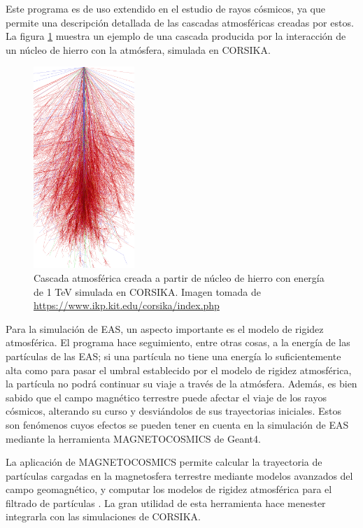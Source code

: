 \documentclass[12pt]{report}
\begin{document}
Este programa es de uso extendido en el estudio de rayos cósmicos, ya que permite una descripción detallada de las cascadas atmosféricas creadas por estos. La figura \ref{fig:ironcascade} muestra un ejemplo de una cascada producida por la interacción de un núcleo de hierro con la atmósfera, simulada en CORSIKA.

\begin{figure}
    \centering
    \includegraphics[width=1.5in]{images/ironcascade.png}
    \caption{Cascada atmosférica creada a partir de núcleo de hierro con energía de 1 TeV simulada en CORSIKA. Imagen tomada de \url{https://www.ikp.kit.edu/corsika/index.php}}
    \label{fig:ironcascade}
\end{figure}

Para la simulación de EAS, un aspecto importante es el modelo de rigidez atmosférica. El programa hace seguimiento, entre otras cosas, a la energía de las partículas de las EAS; si una partícula no tiene una energía lo suficientemente alta como para pasar el umbral establecido por el modelo de rigidez atmosférica, la partícula no podrá continuar su viaje a través de la atmósfera. Además, es bien sabido que el campo magnético terrestre puede afectar el viaje de los rayos cósmicos, alterando su curso y desviándolos de sus trayectorias iniciales. Estos son fenómenos cuyos efectos se pueden tener en cuenta en la simulación de EAS mediante la herramienta MAGNETOCOSMICS de Geant4.

La aplicación de MAGNETOCOSMICS permite calcular la trayectoria de partículas cargadas en la magnetosfera terrestre mediante modelos avanzados del campo geomagnético, y computar los modelos de rigidez atmosférica para el filtrado de partículas \cite{magnetocosmics}. La gran utilidad de esta herramienta hace menester integrarla con las simulaciones de CORSIKA.
\end{document}
